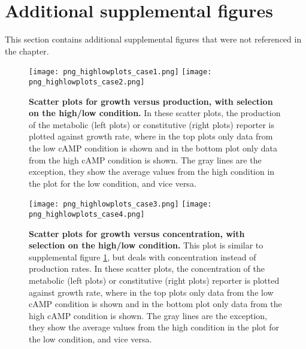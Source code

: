 \FloatBarrier
\clearpage
\section*{Additional supplemental figures}

This section contains additional supplemental figures that were not referenced in the chapter.

\begin{figure}%
	\centering
	\texttt{[image: png\_highlowplots\_case1.png]}
	\texttt{[image: png\_highlowplots\_case2.png]}	
	\caption{ 
		\textbf{Scatter plots for growth versus production, with selection on the high/low condition.}
		In these scatter plots, the production of the metabolic (left plots) or constitutive (right plots) reporter is plotted against growth rate, where in the top plots only data from the low cAMP condition is shown and in the bottom plot only data from the high cAMP condition is shown. The gray lines are the exception, they show the average values from the high condition in the plot for the low condition, and vice versa.		
	}
	\label{fig:CRP:highlowproductionscatters}
\end{figure}%

\begin{figure}%
	\centering
	\texttt{[image: png\_highlowplots\_case3.png]}
	\texttt{[image: png\_highlowplots\_case4.png]}	
	\caption{ 
		\textbf{Scatter plots for growth versus concentration, with selection on the high/low condition.}
		This plot is similar to supplemental figure \ref{fig:CRP:highlowproductionscatters}, but deals with concentration instead of production rates.
In these scatter plots, the concentration of the metabolic (left plots) or constitutive (right plots) reporter is plotted against growth rate, where in the top plots only data from the low cAMP condition is shown and in the bottom plot only data from the high cAMP condition is shown. The gray lines are the exception, they show the average values from the high condition in the plot for the low condition, and vice versa.
	}
	\label{fig:CRP:highlowpconcentrationscatters}
\end{figure}%

